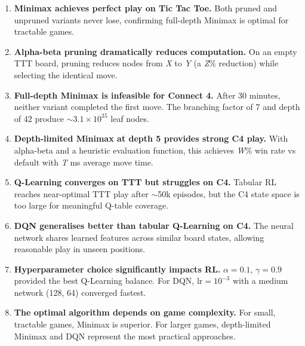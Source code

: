 \documentclass[12pt, a4paper]{article}
\begin{document}
\begin{enumerate}
    \item \textbf{Minimax achieves perfect play on Tic Tac Toe.} Both pruned and unpruned
          variants never lose, confirming full-depth Minimax is optimal for tractable games.

    \item \textbf{Alpha-beta pruning dramatically reduces computation.} On an empty TTT board,
          pruning reduces nodes from \textit{X} to \textit{Y} (a \textit{Z}\% reduction) while
          selecting the identical move.

    \item \textbf{Full-depth Minimax is infeasible for Connect 4.} After 30 minutes, neither
          variant completed the first move. The branching factor of 7 and depth of 42 produce
          $\sim$$3.1 \times 10^{35}$ leaf nodes.

    \item \textbf{Depth-limited Minimax at depth 5 provides strong C4 play.} With alpha-beta
          and a heuristic evaluation function, this achieves \textit{W}\% win rate vs default
          with \textit{T} ms average move time.

    \item \textbf{Q-Learning converges on TTT but struggles on C4.} Tabular RL reaches
          near-optimal TTT play after $\sim$50k episodes, but the C4 state space is too
          large for meaningful Q-table coverage.

    \item \textbf{DQN generalises better than tabular Q-Learning on C4.} The neural network
          shares learned features across similar board states, allowing reasonable play in
          unseen positions.

    \item \textbf{Hyperparameter choice significantly impacts RL.} $\alpha = 0.1$,
          $\gamma = 0.9$ provided the best Q-Learning balance. For DQN, $\text{lr} = 10^{-3}$
          with a medium network (128, 64) converged fastest.

    \item \textbf{The optimal algorithm depends on game complexity.} For small, tractable
          games, Minimax is superior. For larger games, depth-limited Minimax and DQN
          represent the most practical approaches.
\end{enumerate}
\end{document}
